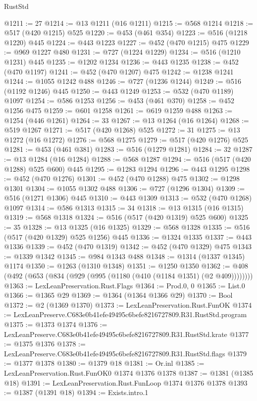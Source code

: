 \begin{lexlean}{RustStd}
\begin{coremodule}
@1211 := 27
@1214 := @13 @1211 (@16 @1211)
@1215 := @568 @1214
@1218 := @517 (@420 @1215) @525
@1220 := @453 (@461 @354)
@1223 := @516 (@1218 @1220) @445
@1224 := @443 @1223
@1227 := @452 (@470 @1215) @475
@1229 := @969 @1227 @480
@1231 := @727 (@1224 @1229)
@1234 := @516 (@1210 @1231) @445
@1235 := @1202 @1234
@1236 := @443 @1235
@1238 := @452 (@470 @1197)
@1241 := @452 (@470 @1207) @475
@1242 := @1238 @1241
@1244 := @1055 @1242 @488
@1246 := @727 (@1236 @1244)
@1249 := @516 (@1192 @1246) @445
@1250 := @443 @1249
@1253 := @532 (@470 @1189) @1097
@1254 := @586 @1253
@1256 := @453 (@461 @370)
@1258 := @452 @1256 @475
@1259 := @601 @1258
@1261 := @619 @1259 @488
@1263 := @1254 (@446 @1261)
@1264 := 33
@1267 := @13 @1264 (@16 @1264)
@1268 := @519 @1267
@1271 := @517 (@420 @1268) @525
@1272 := 31
@1275 := @13 @1272 (@16 @1272)
@1276 := @568 @1275
@1279 := @517 (@420 @1276) @525
@1281 := @453 (@461 @381)
@1283 := @516 (@1279 @1281)
@1284 := 32
@1287 := @13 @1284 (@16 @1284)
@1288 := @568 @1287
@1294 := @516 (@517 (@420 @1288) @525 @600) @445
@1295 := @1283 @1294
@1296 := @443 @1295
@1298 := @452 (@470 @1276)
@1301 := @452 (@470 @1288) @475
@1302 := @1298 @1301
@1304 := @1055 @1302 @488
@1306 := @727 (@1296 @1304)
@1309 := @516 (@1271 @1306) @445
@1310 := @443 @1309
@1313 := @532 (@470 @1268) @1097
@1314 := @586 @1313
@1315 := 34
@1318 := @13 @1315 (@16 @1315)
@1319 := @568 @1318
@1324 := @516 (@517 (@420 @1319) @525 @600)
@1325 := 35
@1328 := @13 @1325 (@16 @1325)
@1329 := @568 @1328
@1335 := @516 (@517 (@420 @1329) @525 @1256) @445
@1336 := @1324 @1335
@1337 := @443 @1336
@1339 := @452 (@470 @1319)
@1342 := @452 (@470 @1329) @475
@1343 := @1339 @1342
@1345 := @984 @1343 @488
@1348 := @1314 (@1337 @1345) @1174
@1350 := @1263 (@1310 @1348)
@1351 := @1250 @1350
@1362 := @408 (@492 (@653 (@834 (@929 (@995 (@1180 (@410 (@1184 @1351) (@2 @409))))))))
@1363 := LexLeanPreservation.Rust.Flags
@1364 := Prod.{0, 0}
@1365 := List.{0}
@1366 := @1365 @29
@1369 := @1364 (@1364 @1366 @29)
@1370 := Bool
@1372 := @2 (@1369 @1370)
@1373 := LexLeanPreservation.Rust.FunOK
@1374 := LexLeanPreserve.C683e0b41efe49495c6befe8216727809.R31.RustStd.program
@1375 := @1373 @1374
@1376 := LexLeanPreserve.C683e0b41efe49495c6befe8216727809.R31.RustStd.krate
@1377 := @1375 @1376
@1378 := LexLeanPreserve.C683e0b41efe49495c6befe8216727809.R31.RustStd.flags
@1379 := @1377 @1378
@1380 := @1379 @18
@1381 := Or.inl
@1385 := LexLeanPreservation.Rust.FunOK0 @1374 @1376 @1378
@1387 := @1381 (@1385 @18)
@1391 := LexLeanPreservation.Rust.FunLoop @1374 @1376 @1378
@1393 := @1387 (@1391 @18)
@1394 := Exists.intro.{1}

\end{coremodule}
\end{lexlean}
